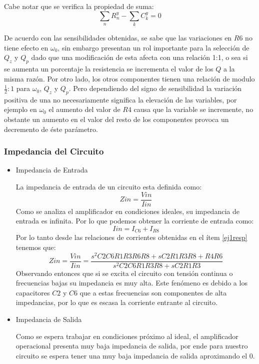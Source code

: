 Cabe notar que se verifica la propiedad de suma:
$$\sum_n R_n^y - \sum_k C_k^y = 0$$

De acuerdo con las sensibilidades obtenidas, se sabe que las variaciones en $R6$ no tiene efecto en $\omega_0$, sin embargo presentan un rol importante para la selección de $Q_z$ y $Q_p$ dado que una modificación de esta afecta con una relación 1:1, o sea si se aumenta un porcentaje la resistencia se incrementa el valor de los $Q$ a la misma razón. Por otro lado, los otros componentes tienen una relación de modulo $\frac{1}{2}:1$ para $\omega_0$, $Q_z$ y $Q_p$. Pero dependiendo del signo de sensibilidad la variación positiva de una no necesariamente significa la elevación de las variables, por ejemplo en $\omega_0$ el aumento del valor de $R4$ causa que la variable se incremente, no obstante un aumento en el valor del resto de los componentes provoca un decremento de éste parámetro. 

\subsubsection{Impedancia del Circuito}

\begin{itemize}
    \item Impedancia de Entrada
    
    La impedancia de entrada de un circuito esta definida como:
    $$Zin = \frac{Vin}{Iin}$$
    Como se analiza el amplificador en condiciones ideales, su impedancia de entrada es infinita. Por lo que podemos obtener la corriente de entrada como:
    $$Iin = I_{C6}+I_{R8}$$
    Por lo tanto desde las relaciones de corrientes obtenidas en el ítem \ref{ej1resp} tenemos que:
    \begin{equation}
        Zin = \frac{Vin}{Iin} = \frac{s^2C2C6R1R3R6R8 + sC2R1R3R8 + R4R6}{s^2C2C6R1R3R8 + sC2R1R3} 
    \end{equation}
    Observando entonces que si se excita el circuito con tensión continua o frecuencias bajas su impedancia es muy alta. Este fenómeno es debido a los capacitores $C2$ y $C6$ que a estas frecuencias son componentes de alta impedancias, por lo que es escasa la corriente entrante al circuito. 
    
    \item Impedancia de Salida
    
    Como se espera trabajar en condiciones próximo al ideal, el amplificador operacional presenta muy baja impedancia de salida, por ende para nuestro circuito se espera tener una muy baja impedancia de salida aproximando el 0. 
\end{itemize}

